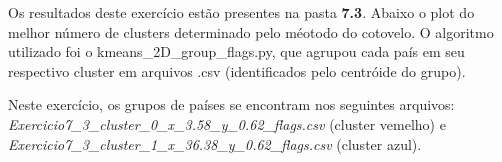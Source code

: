 Os resultados deste exercício estão presentes na pasta \textbf{7.3}. Abaixo o plot do melhor número de clusters determinado pelo méotodo do cotovelo. O algoritmo utilizado foi o kmeans\_2D\_group\_flags.py, que agrupou cada país em seu respectivo cluster em arquivos .csv (identificados pelo centróide do grupo).

\begin{figure}[ht!]
	\vspace{0mm}	%
	\begin{center}
	\end{center}
	\vspace{-2mm}	%
	\label{ex6_fig1}
\end{figure}

Neste exercício, os grupos de países se encontram nos seguintes arquivos: \textit{Exercicio7\_3\_cluster\_0\_x\_3.58\_y\_0.62\_flags.csv} (cluster vemelho) e \textit{Exercicio7\_3\_cluster\_1\_x\_36.38\_y\_0.62\_flags.csv} (cluster azul).